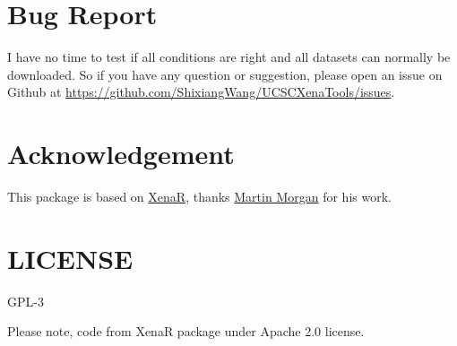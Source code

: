 \documentclass[nofonts,]{tufte-handout}
\begin{document}
\hypertarget{bug-report}{%
\section{Bug Report}\label{bug-report}}

I have no time to test if all conditions are right and all datasets can
normally be downloaded. So if you have any question or suggestion,
please open an issue on Github at
\url{https://github.com/ShixiangWang/UCSCXenaTools/issues}.

\hypertarget{acknowledgement}{%
\section{Acknowledgement}\label{acknowledgement}}

This package is based on
\href{https://github.com/mtmorgan/XenaR}{XenaR}, thanks
\href{https://github.com/mtmorgan}{Martin Morgan} for his work.

\hypertarget{license}{%
\section{LICENSE}\label{license}}

GPL-3

Please note, code from XenaR package under Apache 2.0 license.
\end{document}
